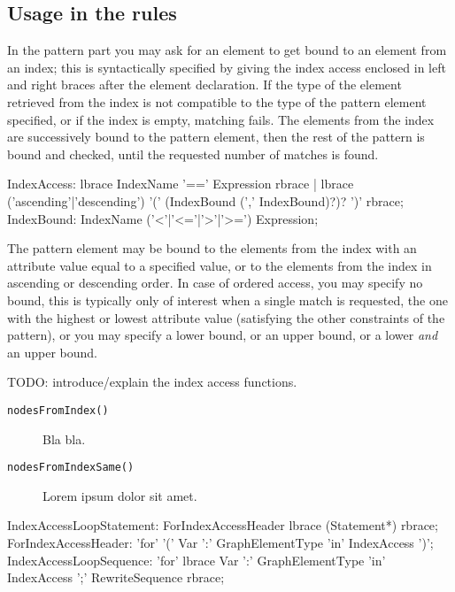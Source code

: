 \subsection*{Usage in the rules}\label{sub:indexusage}

In the pattern part you may ask for an element to get bound to an element from an index;
this is syntactically specified by giving the index access enclosed in left and right braces after the element declaration.
If the type of the element retrieved from the index is not compatible to the type of the pattern element specified,
or if the index is empty, matching fails.
The elements from the index are successively bound to the pattern element, then the rest of the pattern is bound and checked, until the requested number of matches is found.

\begin{rail}
  IndexAccess:
    lbrace IndexName '==' Expression rbrace |
		lbrace ('ascending'|'descending') '(' (IndexBound (',' IndexBound)?)? ')' rbrace;
	IndexBound: IndexName ('<'|'<='|'>'|'>=') Expression;
\end{rail}

The pattern element may be bound to the elements from the index with an attribute value equal to a specified value,
or to the elements from the index in ascending or descending order.
In case of ordered access, you may specify no bound, this is typically only of interest when a single match is requested, the one with the highest or lowest attribute value (satisfying the other constraints of the pattern), or you may specify a lower bound, or an upper bound, or a lower \emph{and} an upper bound.

TODO: introduce/explain the index access functions.
\begin{description}
\item[\texttt{nodesFromIndex()}] Bla bla.
\item[\texttt{nodesFromIndexSame()}] Lorem ipsum dolor sit amet.
\end{description}

\begin{rail}
  IndexAccessLoopStatement:
    ForIndexAccessHeader lbrace (Statement*) rbrace;
  ForIndexAccessHeader:
    'for' '(' Var ':' GraphElementType 'in' IndexAccess ')';
  IndexAccessLoopSequence:
    'for' lbrace Var ':' GraphElementType 'in' IndexAccess ';' RewriteSequence rbrace;
\end{rail}

